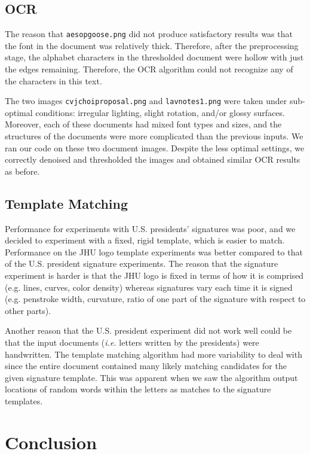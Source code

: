\documentclass[11pt,letterpaper]{article}
\begin{document}
\subsection{OCR}

The reason that {\tt aesop\textunderscore goose.png} did not produce satisfactory results was that the font in the document was relatively thick. Therefore, after the preprocessing stage, the alphabet characters in the thresholded document were hollow with just the edges remaining. Therefore, the OCR algorithm could not recognize any of the characters in this text.

The two images {\tt cv\textunderscore jchoi\textunderscore proposal.png} and {\tt lav\textunderscore notes1.png} were taken under sub-optimal conditions: irregular lighting, slight rotation, and/or glossy surfaces. Moreover, each of these documents had mixed font types and sizes, and the structures of the documents were more complicated than the previous inputs. We ran our code on these two document images. Despite the less optimal settings, we correctly denoised and thresholded the images and obtained similar OCR results as before.

\subsection{Template Matching}

Performance for experiments with U.S. presidents' signatures was poor, and we decided to experiment with a fixed, rigid template, which is easier to match. Performance on the JHU logo template experiments was better compared to that of the U.S. president signature experiments. The reason that the signature experiment is harder is that the JHU logo is fixed in terms of how it is comprised (e.g. lines, curves, color density) whereas signatures vary each time it is signed (e.g. penstroke width, curvature, ratio of one part of the signature with respect to other parts).

Another reason that the U.S. president experiment did not work well could be that the input documents (\textit{i.e.} letters written by the presidents) were handwritten. The template matching algorithm had more variability to deal with since the entire document contained many likely matching candidates for the given signature template. This was apparent when we saw the algorithm output locations of random words within the letters as matches to the signature templates.

\section{Conclusion}
\end{document}
